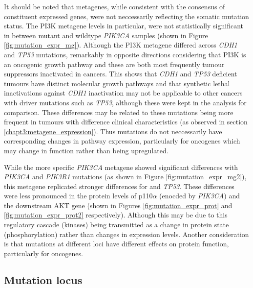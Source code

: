 It should be noted that metagenes, while consistent with the consensus of constituent expressed genes, were not neccessarily reflecting the somatic mutation status. The PI3K \citep{Gatza2011} metagene levels in particular, were not statistically significant in between mutant and wildtype \textit{PIK3CA} samples (shown in Figure \ref{fig:mutation_expr_mg}). Although the PI3K metagene differed across \textit{CDH1} and \textit{TP53} mutations, remarkably in opposite directions considering that PI3K is an oncogenic growth pathway and these are both most frequently tumour suppressors inactivated in cancers. This shows that \textit{CDH1} and \textit{TP53} deficient tumours have distinct molecular growth pathways and that synthetic lethal inactivations against \textit{CDH1} inactivation may not be applicable to other cancers with driver mutations such as \textit{TP53}, although these were kept in the analysis for comparison. These differences may be related to these mutations being more frequent in tumours with difference clinical characteristics (as observed in section \ref{chapt3:metagene_expression}).  Thus mutations do not neccessarily have corresponding changes in pathway expression, particularly for oncogenes which may change in function rather than being upregulated.


While the more specific \textit{PIK3CA} \citep{Gatza2014} metagene showed significant differences with \textit{PIK3CA} and \textit{PIK3R1} mutations (as shown in Figure \ref{fig:mutation_expr_mg2}), this metagene replicated stronger differences for  and \textit{TP53}.  These differences were less pronounced in the protein levels of p110$\alpha$ (enocded by \textit{PIK3CA}) and the downstream AKT gene (shown in Figures \ref{fig:mutation_expr_prot} and \ref{fig:mutation_expr_prot2} respectively). Although this may be due to this regulatory cascade (kinases) being transmitted as a change in protein state (phosphorylation) rather than changes in expression levels. Another consideration is that mutations at different loci have different effects on protein function, particularly for oncogenes.

\FloatBarrier

\subsection{Mutation locus}  \label{chapt3:metagene_mut_locus}

